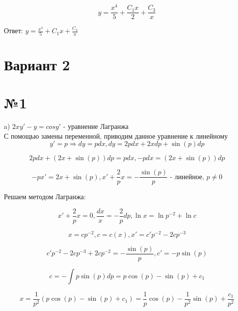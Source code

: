 \documentclass{article}
\begin{document}
\begin{equation*}
    y = \frac{x^4}{5} + \frac{C_1x}{2} + \frac{C_3}{x}
\end{equation*}

Ответ: $
y = \frac{x^4}{5} + C_1x + \frac{C_3}{x}
$
\section*{Вариант 2}
\section*{№1}
a) $ 2xy' - y = cosy' \text{ - уравнение Лагранжа}$\\
С помощью замены переменной, приводим данное уравнение к линейному\\

\begin{equation*}
    y' = p \Rightarrow dy = pdx, dy = 2pdx + 2xdp + \sin{(p)}dp
\end{equation*}

\begin{equation*}
    2pdx + (2x + \sin{(p)})dp = pdx, -pdx = (2x + \sin{(p)})dp
\end{equation*}

\begin{equation*}
    -px' = 2x + \sin{(p)} , x' + \frac{2}{p}x = -\frac{\sin{(p)}}{p} \text{ - линейное, } p \ne 0
\end{equation*}

Решаем методом Лагранжа:

\begin{equation*}
    x' + \frac{2}{p}x = 0, \frac{dx}{x} = -\frac{2}{p}dp, \ln{x} = \ln{p^{-2}} + \ln{c}
\end{equation*}

\begin{equation*}
    x = cp^{-2}, c = c(x), x' = c'p^{-2} - 2cp^{-3}
\end{equation*}

\begin{equation*}
    c'p^{-2} - 2cp^{-3} + 2cp^{-2} = -\frac{\sin{(p)}}{p}, c' = -p\sin{(p)}
\end{equation*}

\begin{equation*}
    c = -\int{p\sin{(p)}dp} = p\cos{(p)} - \sin{(p)} + c_1
\end{equation*}

\begin{equation*}
    x = \frac{1}{p^2}(p\cos{(p)} - \sin{(p)} + c_1) = \frac{1}{p}\cos{(p)} - \frac{1}{p^2}\sin{(p)} + \frac{c_1}{p^2}
\end{equation*}
\end{document}
